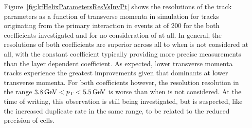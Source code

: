 Figure~\ref{fig:kfHelixParametersResVsInvPt} shows the resolutions of the track parameters as a function of transverse momenta in simulation for tracks originating from the primary interaction in \ttbar events at \PU of 200 for  the both \MS coefficients investigated and for no consideration of \MS at all.
In general, the resolutions of both \MS coefficients are superior across all \pt to when \MS is not considered at all, with the constant \MS coefficient typically providing more precise measurements than the layer dependent coefficient.  
As expected, lower transverse momenta tracks experience the greatest improvements given that \MS dominants at lower transverse momenta.
For both coefficients however, the \pt resolution resolution in the range $ 3.8 \,\text{Ge\hspace{-.08em}V} < p_{\mathrm{T}} < 5.5\,\text{Ge\hspace{-.08em}V}$ is worse than when \MS is not considered.
At the time of writing, this observation is still being investigated, but is suspected, like the increased duplicate rate in the same \pT range, to be related to the reduced precision of \HT cells.


